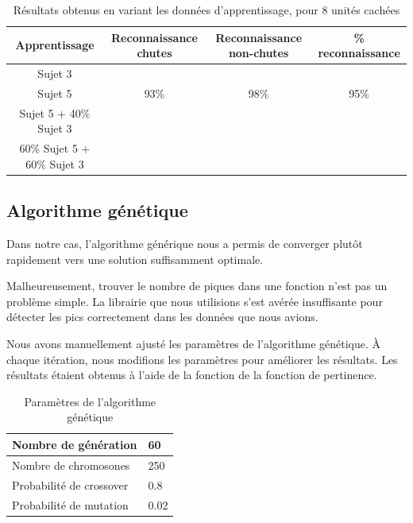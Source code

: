 \documentclass[12pt,letterpaper]{article}
\begin{document}
\begin{table}
\centering
\begin{tabular}{|c|c|c|c|}
    \hline
    Apprentissage & Reconnaissance chutes & Reconnaissance non-chutes & \% reconnaissance \\ \hline
    Sujet 3 &  &  &   \\ \hline
    Sujet 5 & 93\%  & 98\% & 95\% \\ \hline
    Sujet 5 + 40\% Sujet 3 &  &  &  \\ \hline
    60\% Sujet 5 + 60\% Sujet 3 & & & \\ \hline
\end{tabular}
\caption{Résultats obtenus en variant les données d'apprentissage, pour 8 unités cachées}
\label{tbl:neural_results_2}
\end{table}
\subsection{Algorithme génétique}

Dans notre cas, l'algorithme générique nous a permis de converger plutôt rapidement vers une solution suffisamment optimale.

Malheureusement, trouver le nombre de piques dans une fonction n'est pas un problème simple. La librairie que nous utilisions
s'est avérée insuffisante pour détecter les pics correctement dans les données que nous avions.

Nous avons manuellement ajusté les paramètres de l'algorithme génétique. À chaque itération, nous modifions les paramètres pour
améliorer les résultats. Les résultats étaient obtenus à l'aide de la fonction de la fonction de pertinence.

\begin{table}[h]
  \begin{center}
    \begin{tabular} {|l|l|}
        \hline
        Nombre de génération & 60 \\
        \hline
        Nombre de chromosones & 250 \\
        \hline
        Probabilité de crossover & 0.8 \\
        \hline
        Probabilité de mutation & 0.02 \\
        \hline
    \end{tabular}
    \caption{Paramètres de l'algorithme génétique}
  \end{center}
\end{table}
\end{document}
